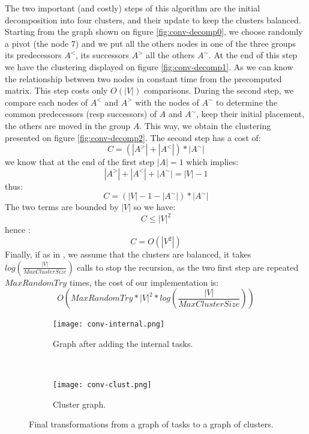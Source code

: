 \documentclass[10pt, conference, compsocconf,pdftex,dvipsnames]{IEEEtran}
\begin{document}
The two important (and costly) steps of this algorithm are the initial
decomposition into four clusters, and their update to keep the clusters
balanced.  Starting from the graph shown on figure \ref{fig:conv-decomp0}, we
choose randomly a pivot (the node $7$) and we put all the others nodes in one
of the three groups its predecessors $A^<$, its successors $A^>$ all the
others $A^{\sim}$. At the end of this step we have the clustering displayed on
figure \ref{fig:conv-decomp1}. As we can know the relationship between two
nodes in constant time from the precomputed matrix. This step costs only
$O(|V|)$ comparisons. During the second step, we compare each nodes of $A^<$
and $A^>$ with the nodes of $A^{\sim}$ to determine the common predecessors
(resp successors) of $A$ and $A^{\sim}$, keep their initial placement, the
others are moved in the group $A$.  This way, we obtain the clustering
presented on figure \ref{fig:conv-decomp2}. The second step has a cost of:
$$C=(|A^>|+|A^<|)*|A^{\sim}|$$ 
we know that at the end of the first step $|A|=1$ which implies: 
$$|A^>|+|A^<|+|A^{\sim}|=|V|-1$$
thus:
$$C=(|V|-1-|A^{\sim}|)*|A^{\sim}|$$ 
The two terms are bounded by $|V|$ so we have: 
$$C\leq|V|^2$$
hence :
$$C=O(|V^2|)$$ 
Finally, if as in \cite{lepere2002new}, we assume that the clusters are
balanced, it takes
$log\left(\frac{|V|}{MaxClusterSize}\right)$ calls to stop the recursion, as
the two first step are repeated $MaxRandomTry$ times, the
cost of our implementation is:
$$O\left(MaxRandomTry*|V|^2*log\left(\frac{|V|}{MaxClusterSize}\right)\right)$$

\begin{figure}[h!]
    \centering
    \begin{subfigure}{0.23\textwidth}
        \centering
        \texttt{[image: conv-internal.png]}
        \caption{Graph after adding the internal tasks.}
        \label{fig:conv-int}
    \end{subfigure}
    ~
    \begin{subfigure}{0.12\textwidth}
        \centering
        \texttt{[image: conv-clust.png]}
        \caption{Cluster graph.}
        \label{fig:conv-clust}
    \end{subfigure}
    \caption{Final transformations from a graph of tasks to a graph of
    clusters.}
    \label{fig:conv-end}
\end{figure}
\end{document}
